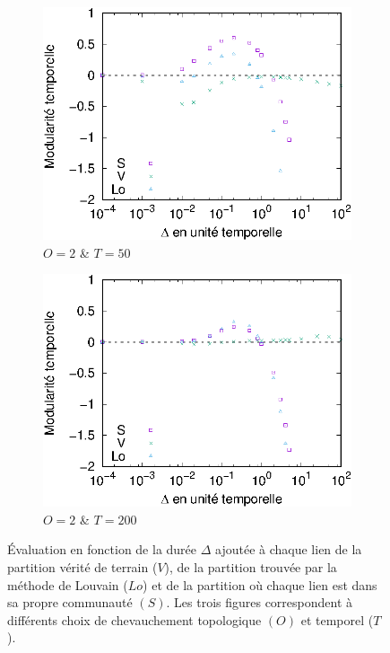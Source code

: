 \begin{figure}[h]
	\begin{subfigure}{0.495\textwidth}
		\includegraphics[width=\textwidth]{img/Qualite/Fonc/comp_50_T_50_O_2_Q_1.eps}
		\caption{$O=2$ \& $T=50$}
		\label{fig:versqualite_fonc_test3}
	\end{subfigure}
	\begin{subfigure}{0.495\textwidth}
		\includegraphics[width=\textwidth]{img/Qualite/Fonc/comp_100_T_200_O_2_Q_1.eps}
		\caption{$O=2$ \& $T=200$}
		\label{fig:versqualite_fonc_test4}
	\end{subfigure}	
	\caption{Évaluation en fonction de la durée $\Delta$ ajoutée à chaque lien de la partition vérité de terrain ($V$), de la partition trouvée par la méthode de Louvain ($Lo$) et de la partition où chaque lien est dans sa propre communauté $(S)$.
	Les trois figures correspondent à différents choix de chevauchement topologique $(O)$ et temporel ($T$).}
	\label{fig:versqualite_fonc_test}
\end{figure}
\bigskip

